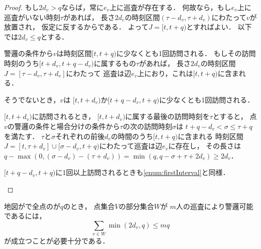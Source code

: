 \begin{proof}
  もし$2d_v > q$ならば，常に$e _v$上に巡査が存在する．
  何故なら，もし$e_v$上に巡査がいない時刻$\tau$があれば，
  長さ$2d_v$の時刻区間$(\tau - d _v, \tau + d _v)$にわたって$v$が放置され，
  仮定に反するからである．
  よって$J =[t, t + q)$とすればよい．
  以下では$2d_v \leq q$とする．

  警邏の条件から$v$は時刻区間$[t, t + q)$に少なくとも1回訪問される．
  もしその訪問時刻のうち$[t + d_v, t + q - d_v)$に属するもの$\tau$があれば，
  長さ$2 d _v$の時刻区間$J = [\tau - d _v, \tau + d _v]$にわたって
  巡査は辺$e_v$上におり，これは$[t, t + q)$に含まれる．

  そうでないとき，$v$は
  $[t, t + d_v)$か$[t + q - d_v, t + q)$に少なくとも1回訪問される．
  \begin{inparaenum}[(i)]
    \item $[t, t + d_v)$に訪問されるとき，
      $[t, t + d_v)$に属する最後の訪問時刻を$\tau$とすると，
      点$v$の警邏の条件と場合分けの条件から$\tau$の次の訪問時刻$\sigma$は
      $t + q - d_v < \sigma \leq \tau + q$を満たす．
      $\tau$と$\sigma$それぞれの前後$d_v$の時間のうち$[t, t + q)$に含まれる
      時刻区間$J = [t, \tau + d_v] \cup [\sigma - d_v, t + q)$にわたって巡査は辺$e_v$に存在し，
      その長さは
      $q - \max(0, (\sigma - d_v) - (\tau + d_v))
        = \min(q, q - \sigma + \tau + 2d_v)
        \geq 2d_v$．
      \label{enum:firstInterval}
    \item $[t + q - d_v, t + q)$に1回以上訪問されるときも\ref{enum:firstInterval}と同様．
    \qedhere
  \end{inparaenum}
\end{proof}


\begin{lemm}
  \label{lemm:StarConditionOfGuarding}
  地図が{\graphStar}で全点の{\maxIdletime}が$q$のとき，
  点集合$V$の部分集合$W$が
  $m$人の巡査により警邏可能であるには，
  \begin{equation}
    \label{equation: star bound}
    \sum_{v \in W} \min(2d_v, q) \leq mq
  \end{equation}
  が成立つことが必要十分である．
\end{lemm}

